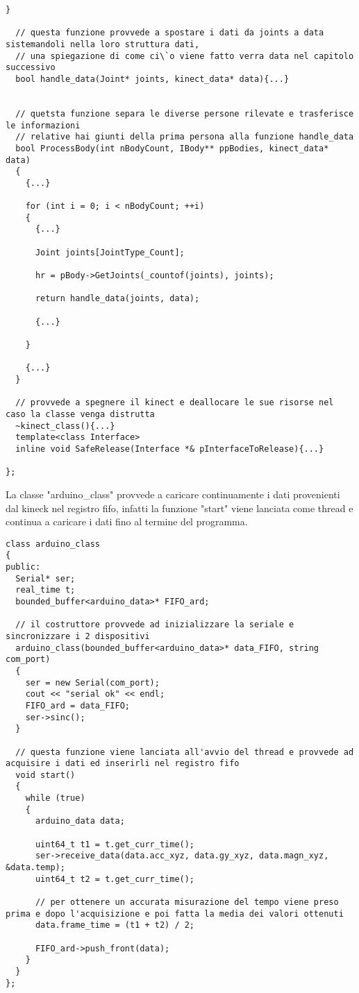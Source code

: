 \documentclass[10pt,a4paper]{article}
\begin{document}
\begin{lstlisting}[style=mycpp, caption=librerie usate, captionpos=b]
  }

  // questa funzione provvede a spostare i dati da joints a data sistemandoli nella loro struttura dati, 
  // una spiegazione di come ci\`o viene fatto verra data nel capitolo successivo
  bool handle_data(Joint* joints, kinect_data* data){...}
  

  // quetsta funzione separa le diverse persone rilevate e trasferisce le informazioni 
  // relative hai giunti della prima persona alla funzione handle_data
  bool ProcessBody(int nBodyCount, IBody** ppBodies, kinect_data* data)
  {
    {...}
    
    for (int i = 0; i < nBodyCount; ++i)
    {
      {...}
      
      Joint joints[JointType_Count];

      hr = pBody->GetJoints(_countof(joints), joints);
      
      return handle_data(joints, data);
          
      {...}
      
    }
    
    {...}
  }

  // provvede a spegnere il kinect e deallocare le sue risorse nel caso la classe venga distrutta
  ~kinect_class(){...}
  template<class Interface>
  inline void SafeRelease(Interface *& pInterfaceToRelease){...}

};
\end{lstlisting}
%
%
La classe "arduino\_class" provvede a caricare continuamente i dati provenienti dal kineck nel registro fifo, infatti la funzione "start" viene lanciata come thread e continua a caricare i dati fino al termine del programma.
\begin{lstlisting}[style=mycpp, caption=librerie usate, captionpos=b]
class arduino_class
{
public:
  Serial* ser;
  real_time t;
  bounded_buffer<arduino_data>* FIFO_ard;

  // il costruttore provvede ad inizializzare la seriale e sincronizzare i 2 dispositivi
  arduino_class(bounded_buffer<arduino_data>* data_FIFO, string com_port)
  {
    ser = new Serial(com_port);
    cout << "serial ok" << endl;
    FIFO_ard = data_FIFO;
    ser->sinc();
  }

  // questa funzione viene lanciata all'avvio del thread e provvede ad acquisire i dati ed inserirli nel registro fifo
  void start()
  {
    while (true)
    {
      arduino_data data;
      
      uint64_t t1 = t.get_curr_time();
      ser->receive_data(data.acc_xyz, data.gy_xyz, data.magn_xyz, &data.temp);
      uint64_t t2 = t.get_curr_time();

	  // per ottenere un accurata misurazione del tempo viene preso prima e dopo l'acquisizione e poi fatta la media dei valori ottenuti
      data.frame_time = (t1 + t2) / 2;

      FIFO_ard->push_front(data);
    }
  }
};
\end{lstlisting}
\end{document}
